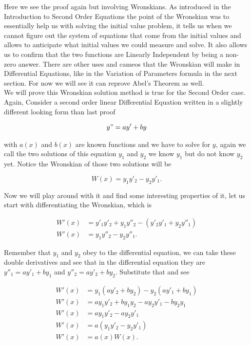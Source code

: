 \documentclass[12pt]{article}
\begin{document}
Here we see the proof again but involving Wronskians. As introduced in the Introduction to Second Order Equations the point of the Wronskian was to essentially help us with solving the initial value problem, it tells us when we cannot figure out the system of equations that come from the initial values and allows to anticipate what initial values we could measure and solve. It also allows us to confirm that the two functions are Linearly Independent by being a non-zero answer. There are other uses and cameos that the Wronskian will make in Differential Equations, like in the Variation of Parameters formula in the next section. For now we will see it can reprove Abel's Theorem as well. \\

We will prove this Wronskian solution method is true for the Second Order case. Again, Consider a second order linear Differential Equation written in a slightly different looking form than last proof

\begin{equation*}
    y"=ay'+by
\end{equation*}

with $a(x)$ and $b(x)$ are known functions and we have to solve for $y$, again we call the two solutions of this equation $y_1$ and $y_2$ we know $y_1$ but do not know $y_2$ yet. Notice the Wronskian of those two solutions will be

\begin{equation*}
    W(x)=y_1y'_2-y_2y'_1.
\end{equation*}

Now we will play around with it and find some interesting properties of it, let us start with differentiating the Wronskian, which is

\begin{align*}
    W'(x)&=y'_1y'_2+y_1y''_2-(y'_2y'_1+y_2y''_1) \\
    W'(x)&=y_1y''_2-y_2y''_1.
\end{align*}

Remember that $y_1$ and $y_2$ obey to the differential equation, we can take these double derivatives and see that in the differential equation they are $y''_1=ay'_1+by_1$ and $y''_2=ay'_2+by_2$. Substitute that and see

\begin{align*}
    W'(x)&=y_1(ay'_2+by_2)-y_2(ay'_1+by_1) \\
    W'(x)&=ay_1y'_2+by_1y_2-ay_2y'_1-by_2y_1 \\
    W'(x)&=ay_1y'_2-ay_2y'_1 \\
    W'(x)&=a(y_1y'_2-y_2y'_1) \\
    W'(x)&=a(x)W(x).
\end{align*}
\end{document}
